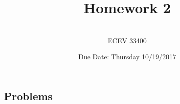 \documentclass{article}
\begin{document}

\title{Homework 2} %
\author{ \\ECEV 33400} %
\date{Due Date: Thursday 10/19/2017} %

\maketitle

%
%

\subsection*{Problems} 
\end{document}
